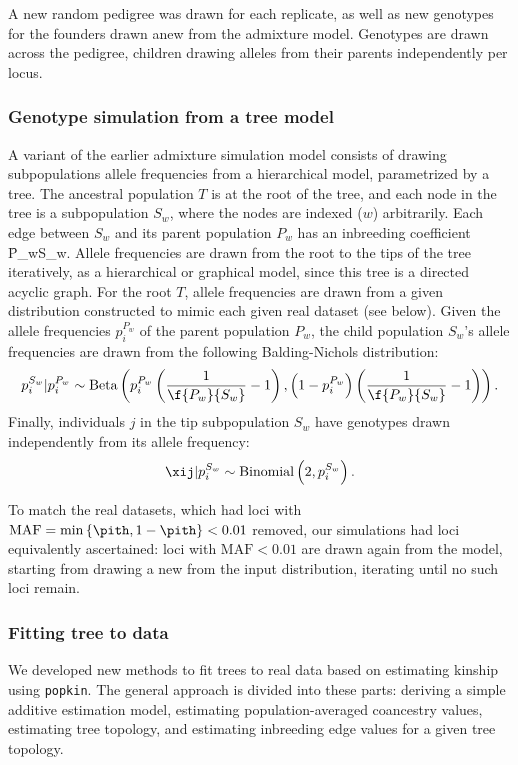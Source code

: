 \documentclass[11pt]{article}
\begin{document}
A new random pedigree was drawn for each replicate, as well as new genotypes for the founders drawn anew from the admixture model.
Genotypes are drawn across the pedigree, children drawing alleles from their parents independently per locus.

\subsubsection{Genotype simulation from a tree model}

A variant of the earlier admixture simulation model consists of drawing subpopulations allele frequencies from a hierarchical model, parametrized by a tree.
The ancestral population $T$ is at the root of the tree, and each node in the tree is a subpopulation $S_w$, where the nodes are indexed ($w$) arbitrarily.
Each edge between $S_w$ and its parent population $P_w$ has an inbreeding coefficient \f{P_w}{S_w}.
Allele frequencies are drawn from the root to the tips of the tree iteratively, as a hierarchical or graphical model, since this tree is a directed acyclic graph.
For the root $T$, allele frequencies \pit are drawn from a given distribution constructed to mimic each given real dataset (see below).
Given the allele frequencies $p_i^{P_w}$ of the parent population $P_w$, the child population $S_w$'s allele frequencies are drawn from the following Balding-Nichols distribution:
$$
p_i^{S_w} | p_i^{P_w}
\sim
\text{Beta} \left(
  p_i^{P_w} \left( \frac{1}{ \f{P_w}{S_w} } - 1 \right),
  \left( 1 - p_i^{P_w} \right) \left( \frac{1}{ \f{P_w}{S_w} } - 1 \right)
\right)
.
$$
Finally, individuals $j$ in the tip subpopulation $S_w$ have genotypes drawn independently from its allele frequency:
$$
\xij | p_i^{S_w}
\sim
\text{Binomial}\left( 2, p_i^{S_w} \right)
.
$$

To match the real datasets, which had loci with $\text{MAF} = \min \left\{ \pith, 1 - \pith \right\} < 0.01$ removed, our simulations had loci equivalently ascertained:
loci with $\text{MAF} < 0.01$ are drawn again from the model, starting from drawing a new \pit from the input distribution, iterating until no such loci remain.

\subsubsection{Fitting tree to data}

We developed new methods to fit trees to real data based on estimating kinship using \texttt{popkin}.
The general approach is divided into these parts:
deriving a simple additive estimation model,
estimating population-averaged coancestry values,
estimating tree topology, and
estimating inbreeding edge values for a given tree topology.
\end{document}
